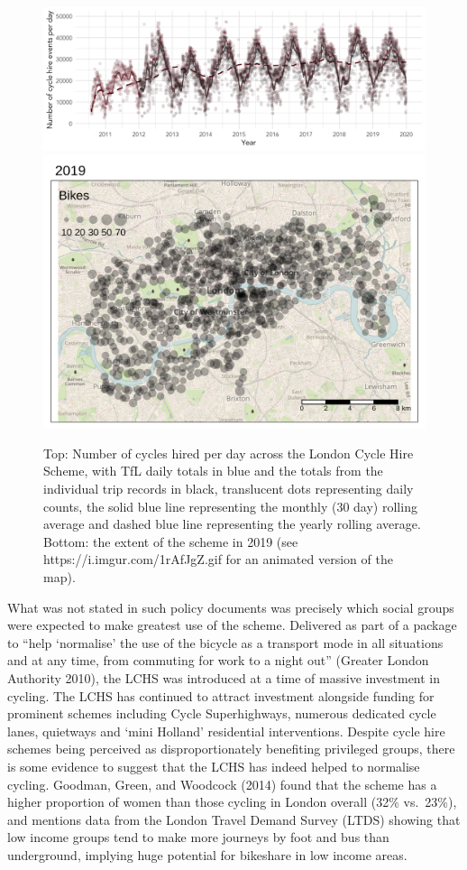 \documentclass[
]{article}
\begin{document}
\begin{figure}

{\centering \includegraphics[width=0.7\linewidth]{figures/cycle-hire-chart-daily} \includegraphics[width=0.7\linewidth]{figures/overview-2019} 

}

\caption{Top: Number of cycles hired per day across the London Cycle Hire Scheme, with TfL daily totals in blue and the totals from the individual trip records in black, translucent dots representing daily counts, the solid blue line representing the monthly (30 day) rolling average and dashed blue line representing the yearly rolling average. Bottom: the extent of the scheme in 2019 (see https://i.imgur.com/1rAfJgZ.gif for an animated version of the map).}\label{fig:cycle-hire-chart-daily}
\end{figure}

What was not stated in such policy documents was precisely which social groups were expected to make greatest use of the scheme.
Delivered as part of a package to ``help `normalise' the use of the bicycle as a transport mode in all situations and at any time, from commuting for work to a night out'' (Greater London Authority 2010), the LCHS was introduced at a time of massive investment in cycling.
The LCHS has continued to attract investment alongside funding for prominent schemes including Cycle Superhighways,
numerous dedicated cycle lanes,
quietways
and `mini Holland' residential interventions.
Despite cycle hire schemes being perceived as disproportionately benefiting privileged groups, there is some evidence to suggest that the LCHS has indeed helped to normalise cycling.
Goodman, Green, and Woodcock (2014) found that the scheme has a higher proportion of women than those cycling in London overall (32\% vs.~23\%), and mentions data from the London Travel Demand Survey (LTDS) showing that low income groups tend to make more journeys by foot and bus than underground, implying huge potential for bikeshare in low income areas.
\end{document}
